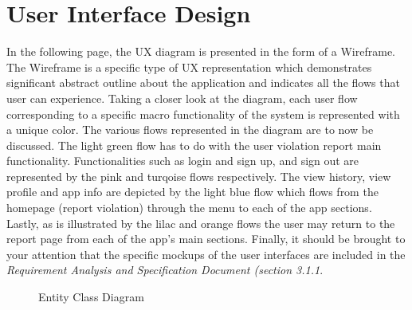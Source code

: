 \section{User Interface Design}
In the following page, the UX diagram is presented in the form of a Wireframe. The Wireframe is a specific type of UX representation which demonstrates significant abstract outline about the application and indicates all the flows that user can experience.  Taking a closer look at the diagram, each user flow corresponding to a specific macro functionality of the system is represented with a unique color. The various flows represented in the diagram are to now be discussed. The light green flow has to do with the user violation report main functionality. Functionalities such as login and sign up, and sign out are represented by the pink and turqoise flows respectively. The view history, view profile and app info are depicted by the light blue flow which flows from the homepage (report violation) through the menu to each of the app sections. Lastly, as is illustrated by the lilac and orange flows the user may return to the report page from each of the app's main sections. Finally, it should be brought to your attention that the specific mockups of the user interfaces are included in the \emph{Requirement Analysis and Specification Document (section 3.1.1}.

\begin{sidewaysfigure}
\begin{figure}[H]
\caption{Entity Class Diagram}
\label{fig:Class}
\centering

\end{figure}
\end{sidewaysfigure}

